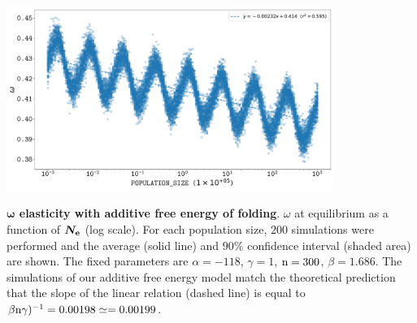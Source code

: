 \documentclass{article}
\begin{document}
\begin{center}
 \includegraphics[width=0.8\textwidth] {artworks/SimuStab-Elasticity.pdf}
\end{center}
\textbf{$\bm{\omega}$ elasticity with additive free energy of folding}.
$\omega$ at equilibrium as a function of $\bm{N_{\mathrm{e}}}$ (log scale).
For each population size, $200$ simulations were performed and the average (solid line) and $90\%$ confidence interval (shaded area) are shown.
The fixed parameters are $\alpha=-118$, $\gamma=1$, $\text{n}=300$, $\beta=1.686$.
The simulations of our additive free energy model match the theoretical prediction that the slope of the linear relation (dashed line) is equal to $\beta \text{n} \gamma)^{-1} = 0.00198 \simeq = 0.00199$.
\end{document}
